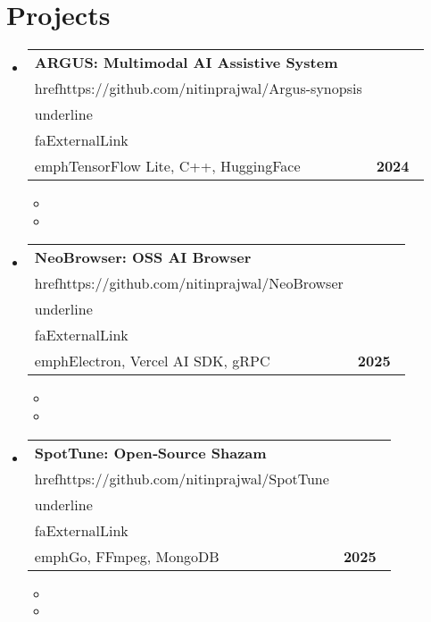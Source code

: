 \documentclass[a4paper]{extarticle}
\makeatletter
\renewcommand\normalsize{\fontsize{10}{11.8}\selectfont}
\newcommand{\resumeItem}[1]{
  \item\normalsize{
    {#1 \vspace{-2pt}}
  }
}
\newcommand{\resumeProjectHeading}[2]{
    \item
    \begin{tabular*}{0.97\textwidth}{l@{\extracolsep{\fill}}r}
      \small#1 & \textbf{\small #2}\
    \end{tabular*}\vspace{-7pt}
}
\newcommand{\resumeSubHeadingListStart}{\begin{itemize}[leftmargin=0.0in, label={}]}
\newcommand{\resumeSubHeadingListEnd}{\end{itemize}}
\newcommand{\resumeItemListStart}{\begin{itemize}}
\newcommand{\resumeItemListEnd}{\end{itemize}\vspace{-5pt}}
\makeatother
\begin{document}
\section{Projects}\n\resumeSubHeadingListStart\n    \resumeProjectHeading{\textbf{ARGUS: Multimodal AI Assistive System} {\\href{https://github.com/nitinprajwal/Argus-synopsis}{\\underline{Link \\faExternalLink}}} $|$ \\emph{TensorFlow Lite, C++, HuggingFace}}{2024}\n    \resumeItemListStart\n        \resumeItem{Led end‑to‑end product development for a patented computer‑vision system achieving 99.9\% accuracy.}\n        \resumeItem{Launched an NLP‑powered assistant and SQL analytics dashboard, informing product roadmap through user data insights.}\n    \resumeItemListEnd\n\n    \resumeProjectHeading{\textbf{NeoBrowser: OSS AI Browser} {\\href{https://github.com/nitinprajwal/NeoBrowser}{\\underline{Link \\faExternalLink}}} $|$ \\emph{Electron, Vercel AI SDK, gRPC}}{2025}\n    \resumeItemListStart\n        \resumeItem{Guided conception and launch of a browser with Python/PyTorch backend, achieving sub‑45ms latency for personalized recommendations.}\n        \resumeItem{Scaled product to 15k+ users on AWS with Docker/Kubernetes and established CI/CD pipeline for rapid iteration.}\n    \resumeItemListEnd\n\n    \resumeProjectHeading{\textbf{SpotTune: Open‑Source Shazam} {\\href{https://github.com/nitinprajwal/SpotTune}{\\underline{Link \\faExternalLink}}} $|$ \\emph{Go, FFmpeg, MongoDB}}{2025}\n    \resumeItemListStart\n        \resumeItem{Designed and launched music‑recognition product using PyTorch CNNs, indexing 5M+ items in MongoDB with sub‑800ms recognition time.}\n        \resumeItem{Collaborated with open‑source contributors to build scalable Kubernetes system handling 750GB/day data pipeline.}\n    \resumeItemListEnd\n\resumeSubHeadingListEnd

\end{document}
